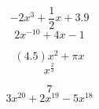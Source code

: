 \begin{Answer}[ref=findpolynomials]
\begin{multicols}{3}
  \begin{equation*}
    \boxed{-2 x^3 + \frac{1}{2}x + 3.9}
  \end{equation*}
  \begin{equation*}
    2 x^{-10} + 4x - 1
  \end{equation*}

  \begin{equation*}
    \boxed{(4.5)x^2 + \pi x}
  \end{equation*}
  \begin{equation*}
    x^{\frac{2}{3}}
  \end{equation*}

  \begin{equation*}
   \boxed{7}
  \end{equation*}
  \begin{equation*}
    \boxed{3x^{20} + 2x^{19} -5 x^{18}}
  \end{equation*}
\end{multicols}

\end{Answer}
